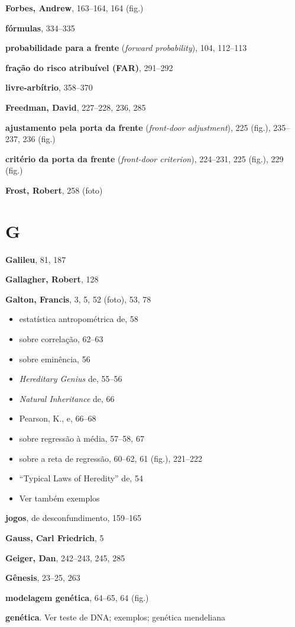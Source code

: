 \documentclass[11pt,a5paper,twoside]{book}
\begin{document}
\textbf{Forbes, Andrew}, 163–164, 164 (fig.)

\textbf{fórmulas}, 334–335

\textbf{probabilidade para a frente} (\textit{forward probability}), 104, 112–113

\textbf{fração do risco atribuível (FAR)}, 291–292

\textbf{livre-arbítrio}, 358–370

\textbf{Freedman, David}, 227–228, 236, 285

\textbf{ajustamento pela porta da frente} (\textit{front-door adjustment}), 225 (fig.), 235–237, 236 (fig.)

\textbf{critério da porta da frente} (\textit{front-door criterion}), 224–231, 225 (fig.), 229 (fig.)

\textbf{Frost, Robert}, 258 (foto)

\section{G}
\textbf{Galileu}, 81, 187

\textbf{Gallagher, Robert}, 128

\textbf{Galton, Francis}, 3, 5, 52 (foto), 53, 78

\begin{itemize}
\item estatística antropométrica de, 58
\item sobre correlação, 62–63
\item sobre eminência, 56
\item \textit{Hereditary Genius} de, 55–56
\item \textit{Natural Inheritance} de, 66
\item Pearson, K., e, 66–68
\item sobre regressão à média, 57–58, 67
\item sobre a reta de regressão, 60–62, 61 (fig.), 221–222
\item “Typical Laws of Heredity” de, 54
\item Ver também exemplos
\end{itemize}
\textbf{jogos}, de desconfundimento, 159–165

\textbf{Gauss, Carl Friedrich}, 5

\textbf{Geiger, Dan}, 242–243, 245, 285

\textbf{Gênesis}, 23–25, 263

\textbf{modelagem genética}, 64–65, 64 (fig.)

\textbf{genética}. Ver teste de DNA; exemplos; genética mendeliana
\end{document}
